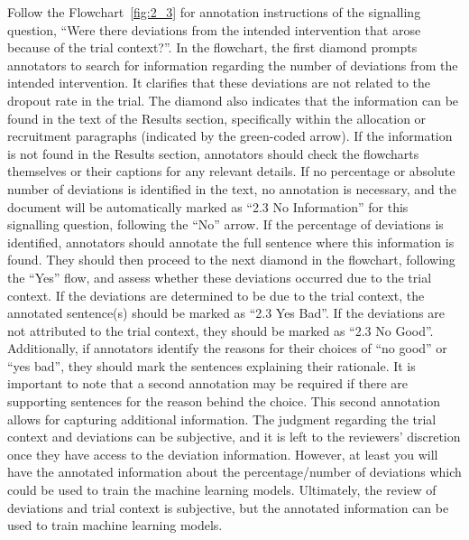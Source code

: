 \documentclass[sn-mathphys,Numbered]{sn-jnl}%
\begin{document}
Follow the Flowchart~\ref{fig:2_3} for annotation instructions of the signalling question, ``Were there deviations from the intended intervention that arose because of the trial context?''.
In the flowchart, the first diamond prompts annotators to search for information regarding the number of deviations from the intended intervention.
It clarifies that these deviations are not related to the dropout rate in the trial.
The diamond also indicates that the information can be found in the text of the Results section, specifically within the allocation or recruitment paragraphs (indicated by the green-coded arrow).
If the information is not found in the Results section, annotators should check the flowcharts themselves or their captions for any relevant details.
If no percentage or absolute number of deviations is identified in the text, no annotation is necessary, and the document will be automatically marked as ``2.3 No Information'' for this signalling question, following the  ``No'' arrow.
If the percentage of deviations is identified, annotators should annotate the full sentence where this information is found.
They should then proceed to the next diamond in the flowchart, following the ``Yes'' flow, and assess whether these deviations occurred due to the trial context.
If the deviations are determined to be due to the trial context, the annotated sentence(s) should be marked as ``2.3 Yes Bad''.
If the deviations are not attributed to the trial context, they should be marked as ``2.3 No Good''.
Additionally, if annotators identify the reasons for their choices of ``no good'' or ``yes bad'', they should mark the sentences explaining their rationale.
It is important to note that a second annotation may be required if there are supporting sentences for the reason behind the choice.
This second annotation allows for capturing additional information.
The judgment regarding the trial context and deviations can be subjective, and it is left to the reviewers' discretion once they have access to the deviation information.
However, at least you will have the annotated information about the percentage/number of deviations which could be used to train the machine learning models.
Ultimately, the review of deviations and trial context is subjective, but the annotated information can be used to train machine learning models.
%
%
%
\end{document}

